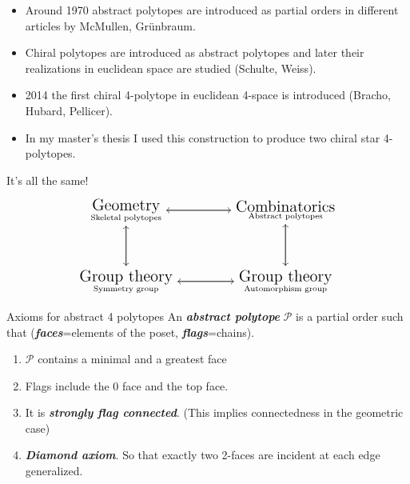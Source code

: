 \begin{frame}
	\begin{itemize}
	\item Around 1970 abstract polytopes are introduced as partial orders in different articles by McMullen, Gr\"unbraum.

	\item Chiral polytopes are introduced as abstract polytopes and later their realizations in euclidean space are studied (Schulte, Weiss).

	\item 2014 the first chiral 4-polytope in euclidean 4-space is introduced (Bracho, Hubard, Pellicer).

	\item In my master's thesis I used this construction to produce two chiral star 4-polytopes.
	\end{itemize}
\end{frame}

\begin{frame}{It's all the same!}
	\[\begin{tikzcd}[ampersand replacement=\&]
		\substack{\text{{\Large Geometry}}  \\ \text{Skeletal polytopes} } \arrow[rr]\arrow[dd]\&\&\substack{\text{{\Large Combinatorics}}\\\text{Abstract polytopes} }\arrow[ll]\arrow[dd]\\ \\
		\substack{\text{{\Large Group theory}}\\\text{Symmetry group} }\arrow[rr]\arrow[uu]\&\&\substack{\text{{\Large Group theory}}\\\text{Automorphism group} }\arrow[ll]\arrow[uu]
			\end{tikzcd}\]
\end{frame}

\begin{frame}{Axioms for abstract 4 polytopes}
	An \textit{\textbf{abstract polytope}} $\mathcal{P}$ is a partial order such that (\textit{\textbf{faces}}=elements of the poset,  \textit{\textbf{flags}}=chains).
	\begin{enumerate}
		\item $\mathcal{P}$ contains a minimal and a greatest face
	
		\item Flags include the 0 face and the top face.

		\item It is \textit{\textbf{strongly flag connected}}. (This implies connectedness in the geometric case)

		 \item \textit{\textbf{Diamond axiom}}. So that exactly two 2-faces are incident at each edge generalized.
	\end{enumerate}
\end{frame}

